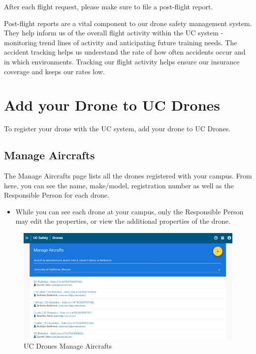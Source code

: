 \documentclass[
  12pt,
]{book}
\providecommand{\tightlist}{%
  \setlength{\itemsep}{0pt}\setlength{\parskip}{0pt}}
\begin{document}
After each flight request, please make sure to file a post-flight report.

Post-flight reports are a vital component to our drone safety management system. They help inform us of the overall flight activity within the UC system - monitoring trend lines of activity and anticipating future training needs. The accident tracking helps us understand the rate of how often accidents occur and in which environments. Tracking our flight activity helps ensure our insurance coverage and keeps our rates low.

\hypertarget{UCDrones-drone}{%
\section{Add your Drone to UC Drones}\label{UCDrones-drone}}

To register your drone with the UC system, add your drone to UC Drones.

\hypertarget{manag-aircraft}{%
\subsection{Manage Aircrafts}\label{manag-aircraft}}

The Manage Aircrafts page lists all the drones registered with your campus. From here, you can see the name, make/model, registration number as well as the Responsible Person for each drone.

\begin{itemize}
\tightlist
\item
  While you can see each drone at your campus, only the Responsible Person may edit the properties, or view the additional properties of the drone.
\end{itemize}

\begin{figure}

{\centering \includegraphics[width=0.95\linewidth]{images/UCDrones_manage_drones} 

}

\caption{UC Drones Manage Aircrafts}\label{fig:UCDrones-manage-aircrafts}
\end{figure}
\end{document}
